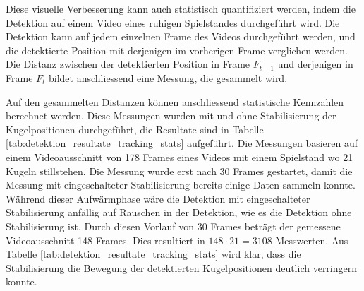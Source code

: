 Diese visuelle Verbesserung kann auch statistisch quantifiziert werden, indem die Detektion auf einem Video eines
ruhigen Spielstandes durchgeführt wird. Die Detektion kann auf jedem einzelnen Frame des Videos durchgeführt werden, und
die detektierte Position mit derjenigen im vorherigen Frame verglichen werden.
Die Distanz zwischen der detektierten Position in Frame $F_{t-1}$ und derjenigen in Frame $F_{t}$ bildet anschliessend
eine Messung, die gesammelt wird.

Auf den gesammelten Distanzen können anschliessend statistische Kennzahlen berechnet werden.
Diese Messungen wurden mit und ohne Stabilisierung der Kugelpositionen durchgeführt, die Resultate sind in Tabelle \ref{tab:detektion_resultate_tracking_stats} aufgeführt.
Die Messungen basieren auf einem Videoausschnitt von 178 Frames eines Videos mit einem Spielstand wo 21 Kugeln stillstehen.
Die Messung wurde erst nach 30 Frames gestartet, damit die Messung mit eingeschalteter Stabilisierung bereits einige
Daten sammeln konnte.
Während dieser Aufwärmphase wäre die Detektion mit eingeschalteter Stabilisierung anfällig auf Rauschen in der Detektion,
wie es die Detektion ohne Stabilisierung ist.
Durch diesen Vorlauf von 30 Frames beträgt der gemessene Videoausschnitt 148 Frames.
Dies resultiert in $148 \cdot 21 = 3108$ Messwerten.
Aus Tabelle \ref{tab:detektion_resultate_tracking_stats} wird klar, dass die Stabilisierung die Bewegung der
detektierten Kugelpositionen deutlich verringern konnte.

